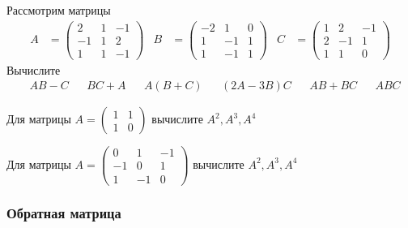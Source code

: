 \begin{exercise}
Рассмотрим матрицы
\begin{align*}
	A&=\begin{pmatrix}
		2 & 1 & -1 \\ -1 & 1 & 2 \\ 1 & 1 & -1 
	\end{pmatrix} &
	B&=\begin{pmatrix}
		-2 & 1 & 0 \\ 1 & -1 & 1 \\ 1 & -1 & 1 
	\end{pmatrix} &
		C&=\begin{pmatrix}
		1 & 2 & -1 \\ 2 & -1 & 1 \\ 1 & 1 & 0 
	\end{pmatrix}
\end{align*}
Вычислите
\begin{align*}
	& AB-C & &BC+A & &A(B+C) & &(2A-3B)C & &AB+BC & &ABC
\end{align*}
\end{exercise}

\begin{exercise}
Для матрицы \(A=\begin{pmatrix} 1 & 1 \\ 1 & 0 \end{pmatrix}\) вычислите
\(A^2, A^3, A^4\)
\end{exercise}
	
\begin{exercise}
Для матрицы \(A=\begin{pmatrix} 0 & 1 & -1 \\ -1 & 0 & 1 \\ 1 & -1 & 0 \end{pmatrix}\) вычислите
\(A^2, A^3, A^4\)
\end{exercise}

\subsubsection{Обратная матрица}

